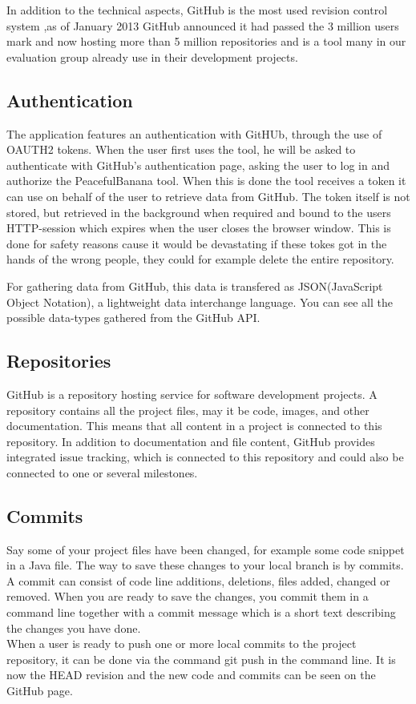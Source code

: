 In addition to the technical aspects, GitHub is the most used revision control system ,as of January 2013 GitHub announced it had passed the 3 million users mark and now hosting more than 5 million repositories and is a tool many in our evaluation group already use in their development projects\cite{githubnumbers}.

\subsection{Authentication}
The application features an authentication with GitHUb, through the use of OAUTH2 tokens. When the user first uses the tool, he will be asked to authenticate with GitHub's authentication page, asking the user to log in and authorize the PeacefulBanana tool. When this is done the tool receives a token it can use on behalf of the user to retrieve data from GitHub. The token itself is not stored, but retrieved in the background when required and bound to the users HTTP-session which expires when the user closes the browser window. This is done for safety reasons cause it would be devastating if these tokes got in the hands of the wrong people, they could for example delete the entire repository.

For gathering data from GitHub, this data is transfered as JSON(JavaScript Object Notation), a lightweight data interchange language. You can see all the possible data-types gathered from the GitHub API.
\subsection{Repositories}
GitHub is a repository hosting service for software development projects. A repository contains all the project files, may it be code, images, and other documentation. This means that all content in a project is connected to this repository. In addition to documentation and file content, GitHub provides integrated issue tracking, which is connected to this repository and could also be connected to one or several milestones. 
\subsection{Commits}
Say some of your project files have been changed, for example some code snippet in a Java file. The way to save these changes to your local branch is by commits. A commit can consist of code line additions, deletions, files added, changed or removed. When you are ready to save the changes, you commit them in a command line together with a commit message which is a short text describing the changes you have done. \\
When a user is ready to push one or more local commits to the project repository, it can be done via the command git push in the command line. It is now the HEAD revision and the new code and commits can be seen on the GitHub page.
